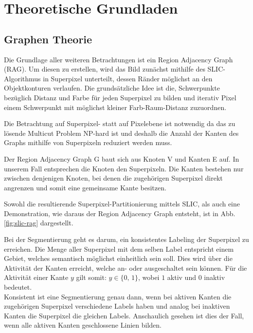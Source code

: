 \chapter{Theoretische Grundladen}\label{ch:theoretischeGrundlagen}
\section{Graphen Theorie}\label{sec:graphTheory}

Die Grundlage aller weiteren Betrachtungen ist ein Region Adjacency Graph (RAG). Um diesen zu erstellen, wird das Bild zunächst mithilfe des SLIC-Algorithmus \cite{slic} in Superpixel unterteilt, dessen Ränder möglichst an den Objektkonturen verlaufen. Die grundsätzliche Idee ist die, Schwerpunkte bezüglich Distanz und Farbe für jeden Superpixel zu bilden und iterativ Pixel einem Schwerpunkt mit möglichst kleiner Farb-Raum-Distanz zuzuordnen. 

Die Betrachtung auf Superpixel- statt auf Pixelebene ist notwendig da das zu lösende Multicut Problem NP-hard ist und deshalb die Anzahl der Kanten des Graphs mithilfe von Superpixeln reduziert werden muss.

Der Region Adjacency Graph G baut sich aus Knoten V und Kanten E auf. In unserem Fall entsprechen die Knoten den Superpixeln. Die Kanten bestehen nur zwischen denjenigen Knoten, bei denen die zugehörigen Superpixel direkt angrenzen und somit eine gemeinsame Kante besitzen. 

Sowohl die resultierende Superpixel-Partitionierung mittels SLIC, als auch eine Demonstration, wie daraus der Region Adjacency Graph entsteht, ist in Abb. \ref{fig:slic-rag} dargestellt.

\begin{figure}[H]

	\centering
	\hfill
\end{figure}
\label{fig:slic-rag}

\vspace{0.5cm}


Bei der Segmentierung geht es darum, ein konsistentes Labeling der Superpixel zu erreichen. Die Menge aller Superpixel mit dem selben Label entspricht einem Gebiet, welches semantisch möglichst einheitlich sein soll. Dies wird über die Aktivität der Kanten erreicht, welche an- oder ausgeschaltet sein können. Für die Aktivität einer Kante $y$ gilt somit: $y \in \{\text{0, 1}\}$, wobei $1$ aktiv und $0$ inaktiv bedeutet. \\
Konsistent ist eine Segmentierung genau dann, wenn bei aktiven Kanten die zugehörigen Superpixel verschiedene Labels haben und analog bei inaktiven Kanten die Superpixel die gleichen Labels. Anschaulich gesehen ist dies der Fall, wenn alle aktiven Kanten geschlossene Linien bilden.


